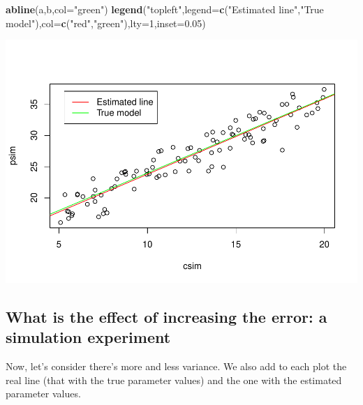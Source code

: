\documentclass[
]{book}
\newenvironment{Shaded}{\begin{snugshade}}{\end{snugshade}}
\newcommand{\AttributeTok}[1]{\textcolor[rgb]{0.13,0.29,0.53}{#1}}
\newcommand{\DecValTok}[1]{\textcolor[rgb]{0.00,0.00,0.81}{#1}}
\newcommand{\FloatTok}[1]{\textcolor[rgb]{0.00,0.00,0.81}{#1}}
\newcommand{\FunctionTok}[1]{\textcolor[rgb]{0.13,0.29,0.53}{\textbf{#1}}}
\newcommand{\NormalTok}[1]{#1}
\newcommand{\StringTok}[1]{\textcolor[rgb]{0.31,0.60,0.02}{#1}}
\begin{document}
\begin{Shaded}
\begin{Highlighting}[]
\FunctionTok{abline}\NormalTok{(a,b,}\AttributeTok{col=}\StringTok{"green"}\NormalTok{)}
\FunctionTok{legend}\NormalTok{(}\StringTok{"topleft"}\NormalTok{,}\AttributeTok{legend=}\FunctionTok{c}\NormalTok{(}\StringTok{"Estimated line"}\NormalTok{,}\StringTok{"True model"}\NormalTok{),}\AttributeTok{col=}\FunctionTok{c}\NormalTok{(}\StringTok{"red"}\NormalTok{,}\StringTok{"green"}\NormalTok{),}\AttributeTok{lty=}\DecValTok{1}\NormalTok{,}\AttributeTok{inset=}\FloatTok{0.05}\NormalTok{)}
\end{Highlighting}
\end{Shaded}

\includegraphics{ECOMODbook_files/figure-latex/a6.26-1.pdf}

\subsection{What is the effect of increasing the error: a simulation experiment}\label{what-is-the-effect-of-increasing-the-error-a-simulation-experiment}

Now, let's consider there's more and less variance. We also add to each plot the real line (that with the true parameter values) and the one with the estimated parameter values.
\end{document}
